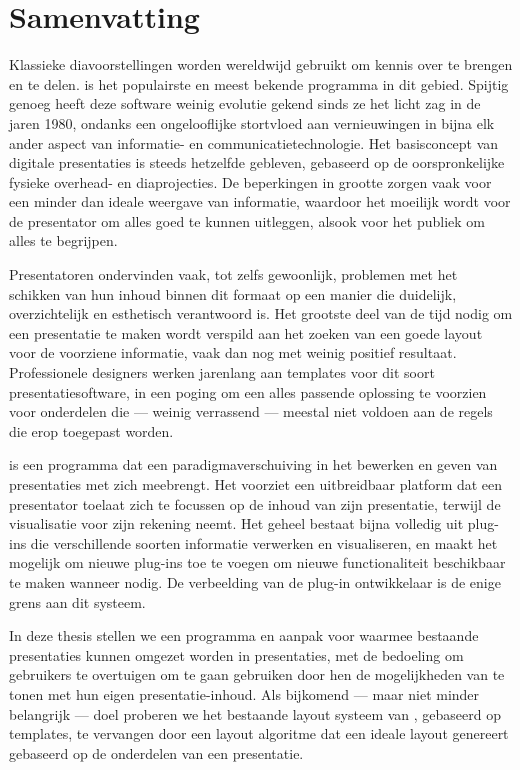 
 \chapter*{Samenvatting}

  Klassieke diavoorstellingen worden wereldwijd gebruikt om kennis over te
  brengen en te delen. \ppt* is het populairste en meest bekende programma in
  dit gebied. Spijtig genoeg heeft deze software weinig evolutie gekend sinds
  ze het licht zag in de jaren 1980, ondanks een ongelooflijke stortvloed aan
  vernieuwingen in bijna elk ander aspect van informatie- en
  communicatietechnologie. Het basisconcept van digitale presentaties is steeds
  hetzelfde gebleven, gebaseerd op de oorspronkelijke fysieke overhead- en
  diaprojecties. De beperkingen in grootte zorgen vaak voor een minder dan
  ideale weergave van informatie, waardoor het moeilijk wordt voor de
  presentator om alles goed te kunnen uitleggen, alsook voor het publiek om
  alles te begrijpen.

  Presentatoren ondervinden vaak, tot zelfs gewoonlijk, problemen met het
  schikken van hun inhoud binnen dit formaat op een manier die duidelijk,
  overzichtelijk en esthetisch verantwoord is. Het grootste deel van de tijd
  nodig om een presentatie te maken wordt verspild aan het zoeken van een goede
  layout voor de voorziene informatie, vaak dan nog met weinig positief
  resultaat. Professionele designers werken jarenlang aan templates voor dit
  soort presentatiesoftware, in een poging om een alles passende oplossing te
  voorzien voor onderdelen die --- weinig verrassend --- meestal niet voldoen
  aan de regels die erop toegepast worden.

  \mxp is een programma dat een paradigmaverschuiving in het bewerken en geven
  van presentaties met zich meebrengt. Het voorziet een uitbreidbaar platform
  dat een presentator toelaat zich te focussen op de inhoud van zijn
  presentatie, terwijl \mxp de visualisatie voor zijn rekening neemt. Het
  geheel bestaat bijna volledig uit plug-ins die verschillende soorten
  informatie verwerken en visualiseren, en maakt het mogelijk om nieuwe
  plug-ins toe te voegen om nieuwe functionaliteit beschikbaar te maken wanneer
  nodig. De verbeelding van de plug-in ontwikkelaar is de enige grens aan dit
  systeem.

  In deze thesis stellen we een programma en aanpak voor waarmee bestaande \ppt
  presentaties kunnen omgezet worden in \mxp presentaties, met de bedoeling om
  \ppt gebruikers te overtuigen om \mxp te gaan gebruiken door hen de
  mogelijkheden van \mxp te tonen met hun eigen presentatie-inhoud. Als
  bijkomend --- maar niet minder belangrijk --- doel proberen we het bestaande
  layout systeem van \mxp, gebaseerd op templates, te vervangen door een layout
  algoritme dat een ideale layout genereert gebaseerd op de onderdelen van een
  presentatie.

